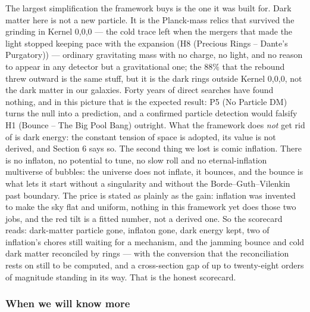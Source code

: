 \documentclass[
  11pt,
]{article}
\begin{document}
The largest simplification the framework buys is the one it was built
for. Dark matter here is not a new particle. It is the Planck-mass
relics that survived the grinding in Kernel 0,0,0 --- the cold trace
left when the mergers that made the light stopped keeping pace with the
expansion (H8 (Precious Rings -- Dante's Purgatory)) --- ordinary
gravitating mass with no charge, no light, and no reason to appear in
any detector but a gravitational one; the \(88\%\) that the rebound
threw outward is the same stuff, but it is the dark rings outside Kernel
0,0,0, not the dark matter in our galaxies. Forty years of direct
searches have found nothing, and in this picture that is the expected
result: P5 (No Particle DM) turns the null into a prediction, and a
confirmed particle detection would falsify H1 (Bounce -- The Big Pool
Bang) outright. What the framework does \emph{not} get rid of is dark
energy: the constant tension of space is adopted, its value is not
derived, and Section 6 says so. The second thing we lost is comic
inflation. There is no inflaton, no potential to tune, no slow roll and
no eternal-inflation multiverse of bubbles: the universe does not
inflate, it bounces, and the bounce is what lets it start without a
singularity and without the Borde--Guth--Vilenkin past boundary. The
price is stated as plainly as the gain: inflation was invented to make
the sky flat and uniform, nothing in this framework yet does those two
jobs, and the red tilt is a fitted number, not a derived one. So the
scorecard reads: dark-matter particle gone, inflaton gone, dark energy
kept, two of inflation's chores still waiting for a mechanism, and the
jamming bounce and cold dark matter reconciled by rings --- with the
conversion that the reconciliation rests on still to be computed, and a
cross-section gap of up to twenty-eight orders of magnitude standing in
its way. That is the honest scorecard.

\hypertarget{when-we-will-know-more}{%
\subsubsection{When we will know more}\label{when-we-will-know-more}}
\end{document}
